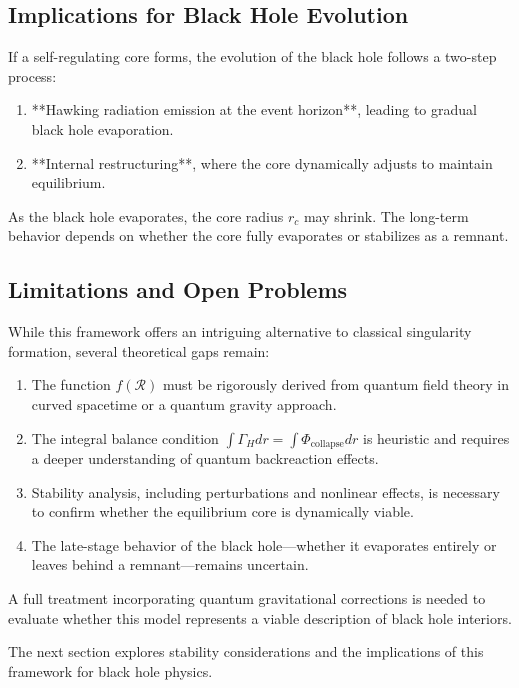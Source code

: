 \subsection{Implications for Black Hole Evolution}

If a self-regulating core forms, the evolution of the black hole follows a two-step process:
\begin{enumerate}
    \item **Hawking radiation emission at the event horizon**, leading to gradual black hole evaporation.
    \item **Internal restructuring**, where the core dynamically adjusts to maintain equilibrium.
\end{enumerate}

As the black hole evaporates, the core radius \( r_c \) may shrink. The long-term behavior depends on whether the core fully evaporates or stabilizes as a remnant.

\subsection{Limitations and Open Problems}

While this framework offers an intriguing alternative to classical singularity formation, several theoretical gaps remain:
\begin{enumerate}
    \item The function \( f(\mathcal{R}) \) must be rigorously derived from quantum field theory in curved spacetime or a quantum gravity approach.
    \item The integral balance condition \( \int \Gamma_H dr = \int \Phi_{\text{collapse}} dr \) is heuristic and requires a deeper understanding of quantum backreaction effects.
    \item Stability analysis, including perturbations and nonlinear effects, is necessary to confirm whether the equilibrium core is dynamically viable.
    \item The late-stage behavior of the black hole—whether it evaporates entirely or leaves behind a remnant—remains uncertain.
\end{enumerate}

A full treatment incorporating quantum gravitational corrections is needed to evaluate whether this model represents a viable description of black hole interiors.

The next section explores stability considerations and the implications of this framework for black hole physics.
